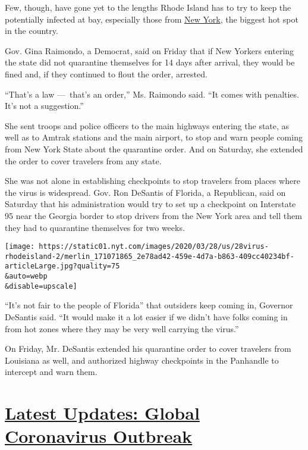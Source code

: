 Few, though, have gone yet to the lengths Rhode Island has to try to
keep the potentially infected at bay, especially those from
\href{https://www.nytimes.com/2020/04/10/nyregion/coronavirus-second-homes-travel.html}{New
York}, the biggest hot spot in the country.

Gov. Gina Raimondo, a Democrat, said on Friday that if New Yorkers
entering the state did not quarantine themselves for 14 days after
arrival, they would be fined and, if they continued to flout the order,
arrested.

``That's a law ---~that's an order,'' Ms. Raimondo said. ``It comes with
penalties. It's not a suggestion.''

She sent troops and police officers to the main highways entering the
state, as well as to Amtrak stations and the main airport, to stop and
warn people coming from New York State about the quarantine order. And
on Saturday, she extended the order to cover travelers from any state.

She was not alone in establishing checkpoints to stop travelers from
places where the virus is widespread. Gov. Ron DeSantis of Florida, a
Republican, said on Saturday that his administration would try to set up
a checkpoint on Interstate 95 near the Georgia border to stop drivers
from the New York area and tell them they had to quarantine themselves
for two weeks.

\texttt{[image: https://static01.nyt.com/images/2020/03/28/us/28virus-rhodeisland-2/merlin\_171071865\_2e78ad42-459e-4d7a-b863-409cc40234bf-articleLarge.jpg?quality=75\\\&auto=webp\\\&disable=upscale]}

``It's not fair to the people of Florida'' that outsiders keep coming
in, Governor DeSantis said. ``It would make it a lot easier if we didn't
have folks coming in from hot zones where they may be very well carrying
the virus.''

On Friday, Mr. DeSantis extended his quarantine order to cover travelers
from Louisiana as well, and authorized highway checkpoints in the
Panhandle to intercept and warn them.

\hypertarget{latest-updates-global-coronavirus-outbreak}{%
\section{\texorpdfstring{\href{https://www.nytimes.com/2020/08/01/world/coronavirus-covid-19.html?action=click\&pgtype=Article\&state=default\&region=MAIN_CONTENT_1\&context=storylines_live_updates}{Latest
Updates: Global Coronavirus
Outbreak}}{Latest Updates: Global Coronavirus Outbreak}}\label{latest-updates-global-coronavirus-outbreak}}

